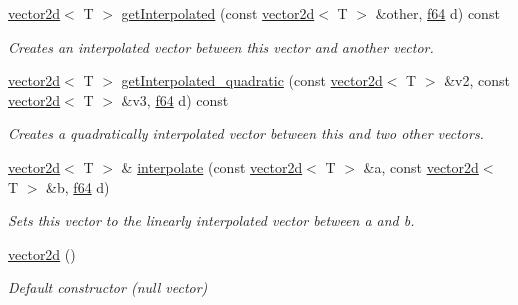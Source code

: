 \begin{DoxyCompactItemize}
\hyperlink{classirr_1_1core_1_1vector2d}{vector2d}$<$ T $>$ \hyperlink{classirr_1_1core_1_1vector2d_ac800722ea56bf8878dc7b67d490464c3}{get\+Interpolated} (const \hyperlink{classirr_1_1core_1_1vector2d}{vector2d}$<$ T $>$ \&other, \hyperlink{namespaceirr_a1325b02603ad449f92c68fc640af9b28}{f64} d) const
\begin{DoxyCompactList}\small\item\em Creates an interpolated vector between this vector and another vector. \end{DoxyCompactList}\item 
\hyperlink{classirr_1_1core_1_1vector2d}{vector2d}$<$ T $>$ \hyperlink{classirr_1_1core_1_1vector2d_aa4bfe9ae4f1e354eeac2ee8d9c2ca7fd}{get\+Interpolated\+\_\+quadratic} (const \hyperlink{classirr_1_1core_1_1vector2d}{vector2d}$<$ T $>$ \&v2, const \hyperlink{classirr_1_1core_1_1vector2d}{vector2d}$<$ T $>$ \&v3, \hyperlink{namespaceirr_a1325b02603ad449f92c68fc640af9b28}{f64} d) const
\begin{DoxyCompactList}\small\item\em Creates a quadratically interpolated vector between this and two other vectors. \end{DoxyCompactList}\item 
\hyperlink{classirr_1_1core_1_1vector2d}{vector2d}$<$ T $>$ \& \hyperlink{classirr_1_1core_1_1vector2d_a85bc48f5c313764fd56b51c730a62210}{interpolate} (const \hyperlink{classirr_1_1core_1_1vector2d}{vector2d}$<$ T $>$ \&a, const \hyperlink{classirr_1_1core_1_1vector2d}{vector2d}$<$ T $>$ \&b, \hyperlink{namespaceirr_a1325b02603ad449f92c68fc640af9b28}{f64} d)
\begin{DoxyCompactList}\small\item\em Sets this vector to the linearly interpolated vector between a and b. \end{DoxyCompactList}\item 
\mbox{\label{classirr_1_1core_1_1vector2d_a72c37c85b812bdaee77a32857d12bb7f}} 
\hyperlink{classirr_1_1core_1_1vector2d_a72c37c85b812bdaee77a32857d12bb7f}{vector2d} ()
\begin{DoxyCompactList}\small\item\em Default constructor (null vector) \end{DoxyCompactList}\item 
\mbox{\label{classirr_1_1core_1_1vector2d_addeb85b77b2f8372609330c66ffe53b0}} 

\end{DoxyCompactItemize}
